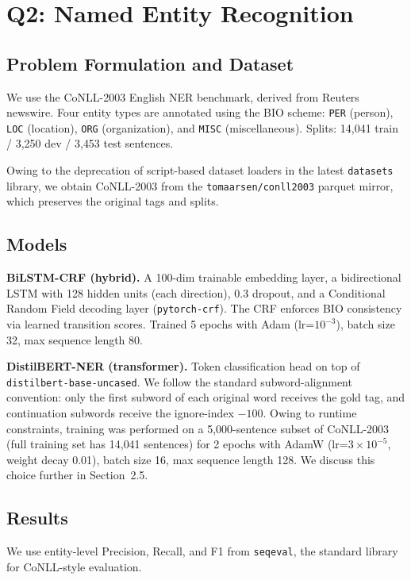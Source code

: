 \documentclass[11pt,a4paper]{article}
\begin{document}
\section{Q2: Named Entity Recognition}

\subsection{Problem Formulation and Dataset}

We use the CoNLL-2003 English NER benchmark, derived from Reuters newswire. Four entity types are annotated using the BIO scheme: \texttt{PER} (person), \texttt{LOC} (location), \texttt{ORG} (organization), and \texttt{MISC} (miscellaneous). Splits: 14{,}041 train / 3{,}250 dev / 3{,}453 test sentences.

Owing to the deprecation of script-based dataset loaders in the latest \texttt{datasets} library, we obtain CoNLL-2003 from the \texttt{tomaarsen/conll2003} parquet mirror, which preserves the original tags and splits.

\subsection{Models}

\textbf{BiLSTM-CRF (hybrid).} A 100-dim trainable embedding layer, a bidirectional LSTM with 128 hidden units (each direction), 0.3 dropout, and a Conditional Random Field decoding layer (\texttt{pytorch-crf}). The CRF enforces BIO consistency via learned transition scores. Trained 5 epochs with Adam (lr=$10^{-3}$), batch size 32, max sequence length 80.

\textbf{DistilBERT-NER (transformer).} Token classification head on top of \texttt{distilbert-base-uncased}. We follow the standard subword-alignment convention: only the first subword of each original word receives the gold tag, and continuation subwords receive the ignore-index $-100$. Owing to runtime constraints, training was performed on a 5{,}000-sentence subset of CoNLL-2003 (full training set has 14{,}041 sentences) for 2 epochs with AdamW (lr=$3\times10^{-5}$, weight decay 0.01), batch size 16, max sequence length 128. We discuss this choice further in Section~2.5.

\subsection{Results}

We use entity-level Precision, Recall, and F1 from \texttt{seqeval}, the standard library for CoNLL-style evaluation.
\end{document}

